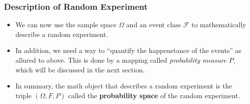 \subsubsection{Description of Random Experiment}
\begin{itemize}
\item We can now use the sample space \(\Omega\) and an event class \(\mathcal{F}\) to
    mathematically describe a random experiment. 
\item In addition, we need a way to ``quantify the happenstance of the
  events'' as allured to above. This is done by a mapping called
  \emph{probability measure \(P\)}, which will be discussed in the next section.
\item In summary, the math object that describes a random experiment is
  the triple \((\Omega, F, P)\) called the \textbf{probability space}
  of the random experiment.
\end{itemize}
